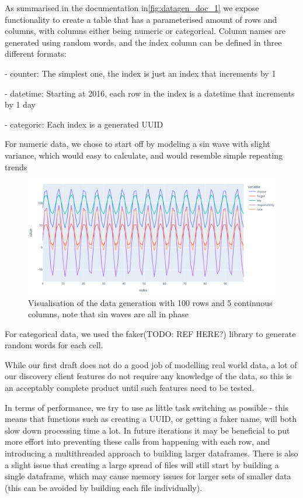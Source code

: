 As summarised in the documentation in\ref{fig:datagen_doc_1} we expose functionality to create a table that has a
parameterised amount of rows and columns, with columns either being numeric or categorical.
Column names are generated using random words, and the index column can be defined in three different formats:

- counter: The simplest one, the index is just an index that increments by 1

- datetime: Starting at 2016, each row in the index is a datetime that increments by 1 day

- categoric: Each index is a generated UUID

For numeric data, we chose to start off by modeling a sin wave with slight variance, which would easy to calculate, and
would resemble simple repeating trends

\begin{figure}[h]
    \centering
    \includegraphics[width=12cm]{figures/data_generation/fake_data_gen_continuous_1}
    \caption{Visualisation of the data generation with 100 rows and 5 continuous columns, note that sin waves are all in phase}
    \label{fig:datagen_fig_1}
\end{figure}

For categorical data, we used the faker(TODO: REF HERE?) library to generate random words for each cell.

While our first draft does not do a good job of modelling real world data, a lot of our discovery client features do not
require any knowledge of the data, so this is an acceptably complete product until such features need to be tested.

In terms of performance, we try to use as little task switching as possible - this means that functions such as creating
a UUID, or getting a faker name, will both slow down processing time a lot.
In future iterations it may be beneficial to put more effort into preventing these calls from happening with each row,
and introducing a multithreaded approach to building larger dataframes.
There is also a slight issue that creating a large spread of files will still start by building a single dataframe, which
may cause memory issues for larger sets of smaller data (this can be avoided by building each file individually).
